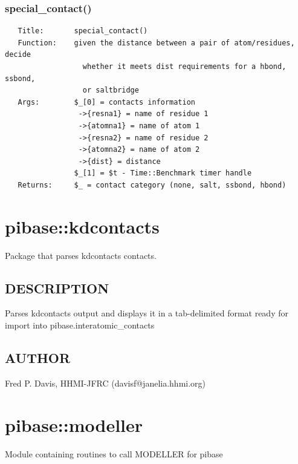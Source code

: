 \documentclass{article}
\begin{document}
\subsubsection*{special\_contact()\label{pibase::interatomic_contacts_special_contact_}}
\begin{verbatim}
   Title:       special_contact()
   Function:    given the distance between a pair of atom/residues, decide
                  whether it meets dist requirements for a hbond, ssbond,
                  or saltbridge
   Args:        $_[0] = contacts information
                 ->{resna1} = name of residue 1
                 ->{atomna1} = name of atom 1
                 ->{resna2} = name of residue 2
                 ->{atomna2} = name of atom 2
                 ->{dist} = distance
                $_[1] = $t - Time::Benchmark timer handle
   Returns:     $_ = contact category (none, salt, ssbond, hbond)
\end{verbatim}
\clearpage
\section{pibase::kdcontacts\label{pibase::kdcontacts}}


Package that parses kdcontacts contacts.

\subsection*{DESCRIPTION\label{pibase::kdcontacts_DESCRIPTION}}


Parses kdcontacts output and displays it in a tab-delimited format ready for
import into pibase.interatomic\_contacts

\subsection*{AUTHOR\label{pibase::kdcontacts_AUTHOR}}


Fred P. Davis, HHMI-JFRC (davisf@janelia.hhmi.org)

\clearpage
\section{pibase::modeller\label{pibase::modeller}}


Module containing routines to call MODELLER for pibase
\end{document}
